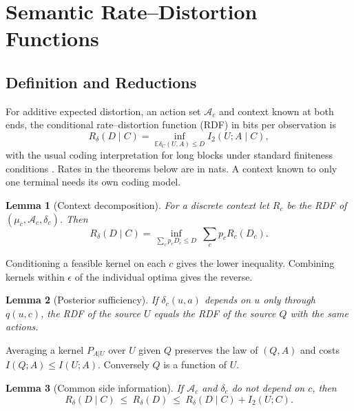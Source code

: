 \documentclass[10pt,journal]{IEEEtran}
\newtheorem{lemma}{Lemma}
\newcommand{\E}{\mathbb E}
\begin{document}
\section{Semantic Rate--Distortion Functions}\label{sec:rdf}
\subsection{Definition and Reductions}
For additive expected distortion, an action set $\mathcal A_c$ and context known at both ends, the conditional rate--distortion function (RDF) in bits per observation is
\begin{equation}
 R_\delta(D\mid C)=\inf_{\E\delta_C(U,A)\le D} I_2(U;A\mid C),
 \label{eq:rdf}
\end{equation}
with the usual coding interpretation for long blocks under standard finiteness conditions \cite{berger1971rate,cover2006elements}. Rates in the theorems below are in nats. A context known to only one terminal needs its own coding model.
\begin{lemma}[Context decomposition]\label{lem:context}
For a discrete context let $R_c$ be the RDF of $(\mu_c,\mathcal A_c,\delta_c)$. Then
\begin{equation}
 R_\delta(D\mid C)=\inf_{\sum_c p_cD_c\le D}\ \sum_c p_cR_c(D_c). \label{eq:context}
\end{equation}
\end{lemma}
\begin{IEEEproof}
Conditioning a feasible kernel on each $c$ gives the lower inequality. Combining kernels within $\epsilon$ of the individual optima gives the reverse.
\end{IEEEproof}
\begin{lemma}[Posterior sufficiency]\label{lem:suff}
If $\delta_c(u,a)$ depends on $u$ only through $q(u,c)$, the RDF of the source $U$ equals the RDF of the source $Q$ with the same actions.
\end{lemma}
\begin{IEEEproof}
Averaging a kernel $P_{A|U}$ over $U$ given $Q$ preserves the law of $(Q,A)$ and costs $I(Q;A)\le I(U;A)$. Conversely $Q$ is a function of $U$.
\end{IEEEproof}
\begin{lemma}[Common side information]\label{lem:knowledge}
If $\mathcal A_c$ and $\delta_c$ do not depend on $c$, then
\begin{equation}
 R_\delta(D\mid C)\ \le\ R_\delta(D)\ \le\ R_\delta(D\mid C)+I_2(U;C). \label{eq:gray}
\end{equation}
\end{lemma}
\end{document}
